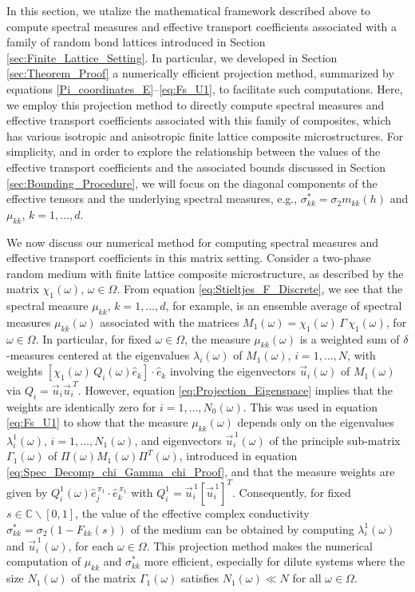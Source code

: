 \documentclass{cmslatex}
\begin{document}
In this section, we utalize the mathematical framework described above
to compute spectral measures and effective transport coefficients
associated with a family of random bond lattices introduced in
Section \ref{sec:Finite_Lattice_Setting}. In particular, 
we developed in Section \ref{sec:Theorem_Proof} a numerically
efficient projection method, summarized by equations
\eqref{Pi_coordinates_E}--\eqref{eq:Fs_U1}, to facilitate such 
computations. Here, we employ this projection method to directly
compute spectral measures and effective transport coefficients
associated with this family of composites, which has various isotropic
and anisotropic finite lattice composite microstructures. For
simplicity, and in order to explore the relationship between the values
of the effective transport coefficients and the associated bounds
discussed in Section \ref{sec:Bounding_Procedure}, we will focus on  
the diagonal components of the effective tensors and the
underlying spectral measures, e.g., $\sigma^*_{kk}=\sigma_2m_{kk}(h)$ and
$\mu_{kk}$, $k=1,\ldots,d$.


We now discuss our numerical method for computing spectral
measures and effective transport coefficients in this matrix setting. 
Consider a two-phase random medium with finite lattice composite
microstructure, as described by the matrix $\chi_1(\omega)$, $\omega\in\Omega$. From
equation \eqref{eq:Stieltjes_F_Discrete}, we see that the spectral
measure $\mu_{kk}$, $k=1,\ldots,d$, for example, is an ensemble average of
spectral measures $\mu_{kk}(\omega)$ associated with the matrices
$M_1(\omega)=\chi_1(\omega)\,\Gamma\,\chi_1(\omega)$, for $\omega\in\Omega$. In particular, for fixed $\omega\in\Omega$,
the measure  $\mu_{kk}(\omega)$ is a weighted sum of $\delta$-measures centered at
the eigenvalues $\lambda_i(\omega)$ of $M_1(\omega)$, $i=1,\ldots,N$, with weights
$[\chi_1(\omega)\,Q_i(\omega)\hat{e}_k]\cdot\hat{e}_k$ involving the eigenvectors 
$\vec{u}_i(\omega)$ of $M_1(\omega)$ via
$Q_i=\vec{u}_i\vec{u}_i^{\;T}$. However, equation
\eqref{eq:Projection_Eigenspace} implies that the weights are
identically zero for $i=1,\ldots,N_0(\omega)$. This was used in equation
\eqref{eq:Fs_U1} to show that the measure $\mu_{kk}(\omega)$ depends only on
the eigenvalues $\lambda^1_i(\omega)$, $i=1,\ldots,N_1(\omega)$, and eigenvectors
$\vec{u}^{\,1}_i(\omega)$ of the principle sub-matrix $\Gamma_1(\omega)$ of
$\Pi(\omega)M_1(\omega)\Pi^T(\omega)$, introduced in 
equation \eqref{eq:Spec_Decomp_chi_Gamma_chi_Proof}, and that the
measure weights are given by
$Q^1_i(\omega)\hat{e}_j^{\,\pi_1}\cdot\hat{e}_k^{\,\pi_1}$ with 
$Q^1_i=\vec{u}^{\,1}_i[\vec{u}^{\,1}_i]^T$.  Consequently,
for fixed $s\in\mathbb{C}\backslash[0,1]$, the value of
the effective complex conductivity $\sigma^*_{kk}=\sigma_2(1-F_{kk}(s))$ of
the medium can be obtained by computing $\lambda^1_i(\omega)$ and
$\vec{u}^{\,1}_i(\omega)$, for each $\omega\in\Omega$. This projection method makes
the numerical computation of $\mu_{kk}$ and $\sigma^*_{kk}$ more efficient,
especially for dilute systems where the size $N_1(\omega)$ of the matrix
$\Gamma_1(\omega)$ satisfies $N_1(\omega)\ll N$ for all $\omega\in\Omega$.  
\end{document}
